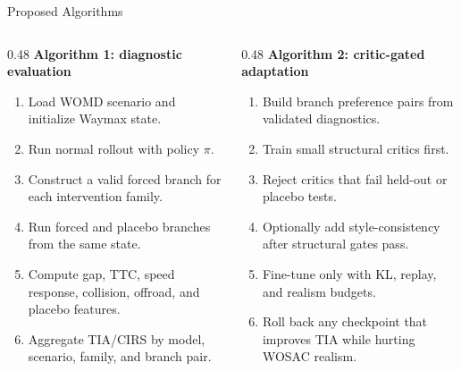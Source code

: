 \documentclass[10pt,aspectratio=169,t]{beamer}
\newcommand{\tightitem}{\setlength\itemsep{0.35em}}
\begin{document}
\begin{frame}{Proposed Algorithms}
  \begin{columns}[T,totalwidth=\textwidth]
    \begin{column}{0.48\textwidth}
      \textbf{Algorithm 1: diagnostic evaluation}
      \begin{enumerate}\tightitem
        \item Load WOMD scenario and initialize Waymax state.
        \item Run normal rollout with policy $\pi$.
        \item Construct a valid forced branch for each intervention family.
        \item Run forced and placebo branches from the same state.
        \item Compute gap, TTC, speed response, collision, offroad, and placebo features.
        \item Aggregate TIA/CIRS by model, scenario, family, and branch pair.
      \end{enumerate}
    \end{column}
    \begin{column}{0.48\textwidth}
      \textbf{Algorithm 2: critic-gated adaptation}
      \begin{enumerate}\tightitem
        \item Build branch preference pairs from validated diagnostics.
        \item Train small structural critics first.
        \item Reject critics that fail held-out or placebo tests.
        \item Optionally add style-consistency after structural gates pass.
        \item Fine-tune only with KL, replay, and realism budgets.
        \item Roll back any checkpoint that improves TIA while hurting WOSAC realism.
      \end{enumerate}
    \end{column}
  \end{columns}
\end{frame}
\end{document}
